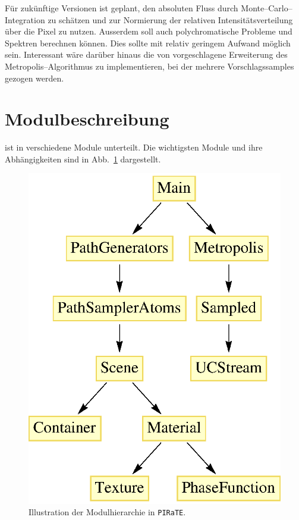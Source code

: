 	Für zukünftige Versionen ist geplant, den absoluten Fluss durch Monte--Carlo--Integration zu schätzen und zur Normierung der relativen Intensitätsverteilung über die Pixel zu nutzen. Ausserdem soll \pirate auch polychromatische Probleme und Spektren berechnen können. Dies sollte mit relativ geringem Aufwand möglich sein. Interessant wäre darüber hinaus die von \citet{Liu:2000p8427} vorgeschlagene Erweiterung des Metropolis--Algorithmus zu implementieren, bei der mehrere Vorschlagssamples gezogen werden.
	
	\section{Modulbeschreibung}
	
	\pirate ist in verschiedene Module unterteilt. Die wichtigsten Module und ihre Ab\-hän\-gig\-kei\-ten sind in Abb.~\ref{fig:moduleoverview} dargestellt.
		\begin{figure}
				\centering
				\includegraphics[height=0.3\textheight]{moduleoverview.eps}
				\caption{Illustration der Modulhierarchie in \texttt{PIRaTE}.}
				\label{fig:moduleoverview}
		\end{figure}
